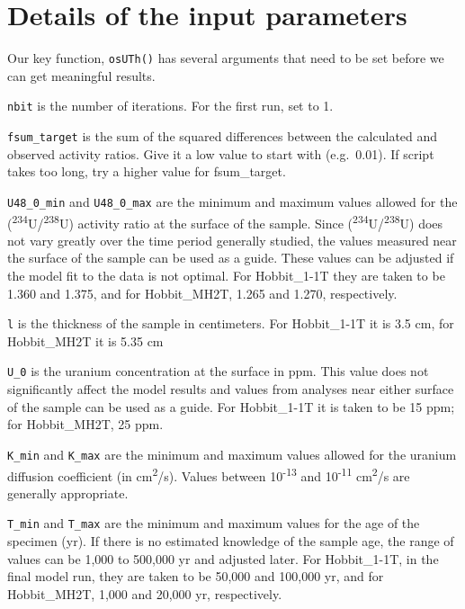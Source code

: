 \documentclass[]{elsarticle} %
\begin{document}
\hypertarget{details-of-the-input-parameters}{%
\section{Details of the input parameters}\label{details-of-the-input-parameters}}

Our key function, \texttt{osUTh()} has several arguments that need to be set before we can get meaningful results.

\texttt{nbit} is the number of iterations. For the first run, set to 1.

\texttt{fsum\_target} is the sum of the squared differences between the calculated and observed activity ratios. Give it a low value to start with (e.g.~0.01). If script takes too long, try a higher value for fsum\_target.

\texttt{U48\_0\_min} and \texttt{U48\_0\_max} are the minimum and maximum values allowed for the (\textsuperscript{234}U/\textsuperscript{238}U) activity ratio at the surface of the sample. Since (\textsuperscript{234}U/\textsuperscript{238}U) does not vary greatly over the time period generally studied, the values measured near the surface of the sample can be used as a guide. These values can be adjusted if the model fit to the data is not optimal. For Hobbit\_1-1T they are taken to be 1.360 and 1.375, and for Hobbit\_MH2T, 1.265 and 1.270, respectively.

\texttt{l} is the thickness of the sample in centimeters. For Hobbit\_1-1T it is 3.5 cm, for Hobbit\_MH2T it is 5.35 cm

\texttt{U\_0} is the uranium concentration at the surface in ppm. This value does not significantly affect the model results and values from analyses near either surface of the sample can be used as a guide. For Hobbit\_1-1T it is taken to be 15 ppm; for Hobbit\_MH2T, 25 ppm.

\texttt{K\_min} and \texttt{K\_max} are the minimum and maximum values allowed for the uranium diffusion coefficient (in cm\textsuperscript{2}/s). Values between 10\textsuperscript{-13} and 10\textsuperscript{-11} cm\textsuperscript{2}/s are generally appropriate.

\texttt{T\_min} and \texttt{T\_max} are the minimum and maximum values for the age of the specimen (yr). If there is no estimated knowledge of the sample age, the range of values can be 1,000 to 500,000 yr and adjusted later. For Hobbit\_1-1T, in the final model run, they are taken to be 50,000 and 100,000 yr, and for Hobbit\_MH2T, 1,000 and 20,000 yr, respectively.
\end{document}
